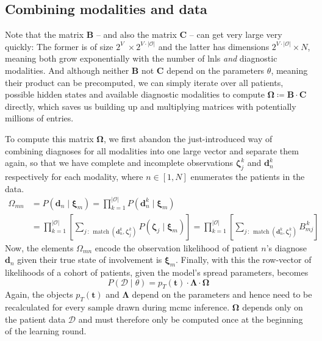 \documentclass[\relativeRoot/main.tex]{subfiles}
\begin{document}
\subsection{Combining modalities and data}
\label{subsec:unilateral:formalism:combine}

Note that the matrix $\mathbf{B}$ -- and also the matrix $\mathbf{C}$ -- can get very large very quickly: The former is of size $2^V \!\!\!\; \times 2^{V\cdot|\mathcal{O}|}$ and the latter has dimensions $2^{V\cdot|\mathcal{O}|} \times N$, meaning both grow exponentially with the number of \glspl{lnl} \emph{and} diagnostic modalities. And although neither $\mathbf{B}$ not $\mathbf{C}$ depend on the parameters $\theta$, meaning their product can be precomputed, we can simply iterate over all patients, possible hidden states and available diagnostic modalities to compute $\boldsymbol{\Omega} \coloneqq \mathbf{B} \cdot \mathbf{C}$ directly, which saves us building up and multiplying matrices with potentially millions of entries.

To compute this matrix $\boldsymbol{\Omega}$, we first abandon the just-introduced way of combining diagnoses for all modalities into one large vector and separate them again, so that we have complete and incomplete observations $\boldsymbol{\zeta}_j^k$ and $\mathbf{d}_n^k$ respectively for each modality, where $n \in [1,N]$ enumerates the patients in the data.
%
\begin{equation}
    \begin{aligned}
        \Omega_{mn} 
        &= P \left( \mathbf{d}_n \mid \boldsymbol{\xi}_m  \right)
        = \prod_{k=1}^{|\mathcal{O}|}{ P \left( \mathbf{d}_n^k \mid \boldsymbol{\xi}_m \right) } \\
        &=  \prod_{k=1}^{|\mathcal{O}|}{ \left[ \sum_{j \,:\, \operatorname{match}(\mathbf{d}_n^k, \boldsymbol{\zeta}_j^k) }{ P \left( \boldsymbol{\zeta}_j \mid \boldsymbol{\xi}_m \right)} \right] }
        = \prod_{k=1}^{|\mathcal{O}|}{ \left[ \sum_{j \,:\, \operatorname{match}(\mathbf{d}_n^k, \boldsymbol{\zeta}_j^k) }{B_{mj}^{\,k}} \right] }
    \end{aligned}
\end{equation}
%
Now, the elements $\Omega_{mn}$ encode the observation likelihood of patient $n$'s diagnose $\mathbf{d}_n$ given their true state of involvement is $\boldsymbol{\xi}_m$. Finally, with this the row-vector of likelihoods of a cohort of patients, given the model's spread parameters, becomes
%
\begin{equation}
    P \left( \boldsymbol{\mathcal{D}} \mid \theta \right) = p_T\left( \mathbf{t} \right) \cdot \boldsymbol{\Lambda} \cdot \boldsymbol{\Omega}
\end{equation}
%
Again, the objects $p_T(\mathbf{t})$ and $\boldsymbol{\Lambda}$ depend on the parameters and hence need to be recalculated for every sample drawn during \gls{mcmc} inference. $\boldsymbol{\Omega}$ depends only on the patient data $\mathcal{D}$ and must therefore only be computed once at the beginning of the learning round.
\end{document}
